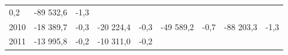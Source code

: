 \begin{longtable}[]{@{}lllllllll@{}}
\begin{minipage}[t]{0.06\columnwidth}
0,2\strut
\end{minipage} & \begin{minipage}[t]{0.09\columnwidth}\raggedright
-89 532,6\strut
\end{minipage} & \begin{minipage}[t]{0.06\columnwidth}\raggedright
-1,3\strut
\end{minipage}\tabularnewline
\begin{minipage}[t]{0.05\columnwidth}\raggedright
2010\strut
\end{minipage} & \begin{minipage}[t]{0.10\columnwidth}\raggedright
-18 389,7\strut
\end{minipage} & \begin{minipage}[t]{0.06\columnwidth}\raggedright
-0,3\strut
\end{minipage} & \begin{minipage}[t]{0.16\columnwidth}\raggedright
-20 224,4\strut
\end{minipage} & \begin{minipage}[t]{0.06\columnwidth}\raggedright
-0,3\strut
\end{minipage} & \begin{minipage}[t]{0.12\columnwidth}\raggedright
-49 589,2\strut
\end{minipage} & \begin{minipage}[t]{0.06\columnwidth}\raggedright
-0,7\strut
\end{minipage} & \begin{minipage}[t]{0.09\columnwidth}\raggedright
-88 203,3\strut
\end{minipage} & \begin{minipage}[t]{0.06\columnwidth}\raggedright
-1,3\strut
\end{minipage}\tabularnewline
\begin{minipage}[t]{0.05\columnwidth}\raggedright
2011\strut
\end{minipage} & \begin{minipage}[t]{0.10\columnwidth}\raggedright
-13 995,8\strut
\end{minipage} & \begin{minipage}[t]{0.06\columnwidth}\raggedright
-0,2\strut
\end{minipage} & \begin{minipage}[t]{0.16\columnwidth}\raggedright
-10 311,0\strut
\end{minipage} & \begin{minipage}[t]{0.06\columnwidth}\raggedright
-0,2\strut
\end{minipage} & \begin{minipage}[t]{0.12\columnwidth}\raggedright

\end{minipage}
\end{longtable}
